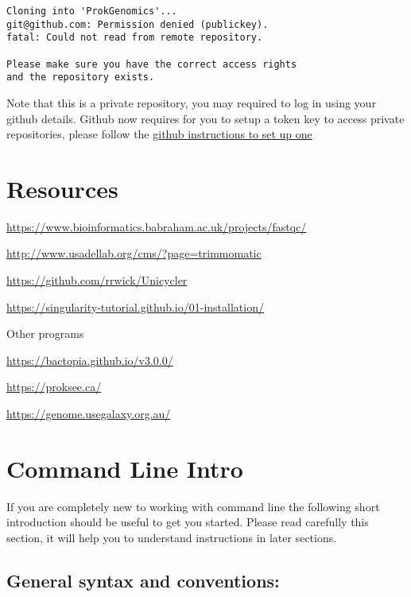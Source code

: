 \documentclass[
]{book}
\begin{document}
\begin{verbatim}
Cloning into 'ProkGenomics'...
git@github.com: Permission denied (publickey).
fatal: Could not read from remote repository.

Please make sure you have the correct access rights
and the repository exists.
\end{verbatim}

Note that this is a private repository, you may required to log in using your github details. Github now requires for you to setup a token key to access private repositories, please follow the \href{https://docs.github.com/en/authentication/keeping-your-account-and-data-secure/managing-your-personal-access-tokens}{github instructions to set up one}

\hypertarget{resources}{%
\chapter{Resources}\label{resources}}

\url{https://www.bioinformatics.babraham.ac.uk/projects/fastqc/}

\url{http://www.usadellab.org/cms/?page=trimmomatic}

\url{https://github.com/rrwick/Unicycler}

\url{https://singularity-tutorial.github.io/01-installation/}

Other programs

\url{https://bactopia.github.io/v3.0.0/}

\url{https://proksee.ca/}

\url{https://genome.usegalaxy.org.au/}

\hypertarget{command-line-intro}{%
\chapter{Command Line Intro}\label{command-line-intro}}

If you are completely new to working with command line the following short introduction should be useful to get you started. Please read carefully this section, it will help you to understand instructions in later sections.

\hypertarget{general-syntax-and-conventions}{%
\section{General syntax and conventions:}\label{general-syntax-and-conventions}}
\end{document}

